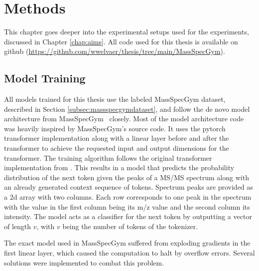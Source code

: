 \chapter{Methods}
\label{chap:methods}

This chapter goes deeper into the experimental setups used for the experiments, discussed in Chapter \ref{chap:aims}.
All code used for this thesis is available on github (\url{https://github.com/wwelvaer/thesis/tree/main/MassSpecGym}).

\section{Model Training}
\label{sec:training}

All models trained for this thesis use the labeled MassSpecGym dataset, described in Section \ref{subsec:massspecgymdataset}, and follow the de novo model architecture from MassSpecGym~\cite{bushuiev2024massspecgym} closely.
Most of the model architecture code was heavily inspired by MassSpecGym's source code.
It uses the pytorch transformer implementation along with a linear layer before and after the transformer to achieve the requested input and output dimensions for the transformer.
The training algorithm follows the original transformer implementation from \textcite{vaswani2017attention}.
This results in a model that predicts the probability distribution of the next token given the peaks of a \ac{MS/MS} spectrum along with an already generated context sequence of tokens.
Spectrum peaks are provided as a 2d array with two columns. Each row corresponds to one peak in the spectrum with the value in the first column being its m/z value and the second column its intensity.
The model acts as a classifier for the next token by outputting a vector of length $v$, with $v$ being the number of tokens of the tokenizer.

The exact model used in MassSpecGym suffered from exploding gradients in the first linear layer, which caused the computation to halt by overflow errors.
Several solutions were implemented to combat this problem.

